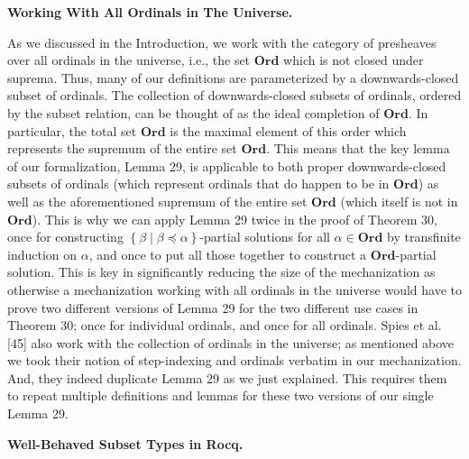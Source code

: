  
 
 
\par\medskip\noindent\textbf{Working With All Ordinals in The Universe.}\par
 
 
As we discussed in the Introduction, we work with the category of presheaves over all ordinals in the universe, i.e., the set $\mathbf{Ord}$ which is not closed under suprema. Thus, many of our definitions are parameterized by a downwards-closed subset of ordinals. The collection of downwards-closed subsets of ordinals, ordered by the subset relation, can be thought of as the ideal completion of $\mathbf{Ord}$. In particular, the total set $\mathbf{Ord}$ is the maximal element of this order which represents the supremum of the entire set $\mathbf{Ord}$. This means that the key lemma of our formalization, Lemma 29, is applicable to both proper downwards-closed subsets of ordinals (which represent ordinals that do happen to be in $\mathbf{Ord}$) as well as the aforementioned supremum of the entire set $\mathbf{Ord}$ (which itself is not in $\mathbf{Ord}$). This is why we can apply Lemma 29 twice in the proof of Theorem 30, once for constructing $\left\{\beta\middle|\beta\preceq\alpha\right\}$-partial solutions for all $\alpha\in\mathbf{Ord}$ by transfinite induction on $\alpha$, and once to put all those together to construct a $\mathbf{Ord}$-partial solution. This is key in significantly reducing the size of the mechanization as otherwise a mechanization working with all ordinals in the universe would have to prove two different versions of Lemma 29 for the two different use cases in Theorem 30; once for individual ordinals, and once for all ordinals. Spies et al. [45] also work with the collection of ordinals in the universe; as mentioned above we took their notion of step-indexing and ordinals verbatim in our mechanization. And, they indeed duplicate Lemma 29 as we just explained. This requires them to repeat multiple definitions and lemmas for these two versions of our single Lemma 29.\par
 
 
 
 
\par\medskip\noindent\textbf{Well-Behaved Subset Types in Rocq.}\par
 
